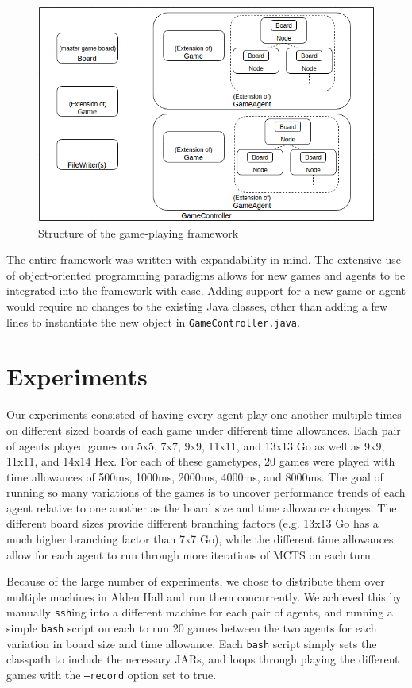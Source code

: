 \begin{figure}[h]
\centering
\includegraphics[scale=0.58]{images/finalframework.png}
\caption{Structure of the game-playing framework}
\label{fig:finalframework}
\end{figure}

The entire framework was written with expandability in mind.  The extensive use of object-oriented programming paradigms allows for new games and agents to be integrated into the framework with ease.  Adding support for a new game or agent would require no changes to the existing Java classes, other than adding a few lines to instantiate the new object in \texttt{GameController.java}.

\section{Experiments}
Our experiments consisted of having every agent play one another multiple times on different sized boards of each game under different time allowances.  Each pair of agents played games on 5x5, 7x7, 9x9, 11x11, and 13x13 Go as well as 9x9, 11x11, and 14x14 Hex.  For each of these gametypes, 20 games were played with time allowances of 500ms, 1000ms, 2000ms, 4000ms, and 8000ms.  The goal of running so many variations of the games is to uncover performance trends of each agent relative to one another as the board size and time allowance changes.  The different board sizes provide different branching factors (e.g. 13x13 Go has a much higher branching factor than 7x7 Go), while the different time allowances allow for each agent to run through more iterations of MCTS on each turn.

Because of the large number of experiments, we chose to distribute them over multiple machines in Alden Hall and run them concurrently.  We achieved this by manually \texttt{ssh}ing into a different machine for each pair of agents, and running a simple \texttt{bash} script on each to run 20 games between the two agents for each variation in board size and time allowance.  Each \texttt{bash} script simply sets the classpath to include the necessary JARs, and loops through playing the different games with the \texttt{--record} option set to true.

